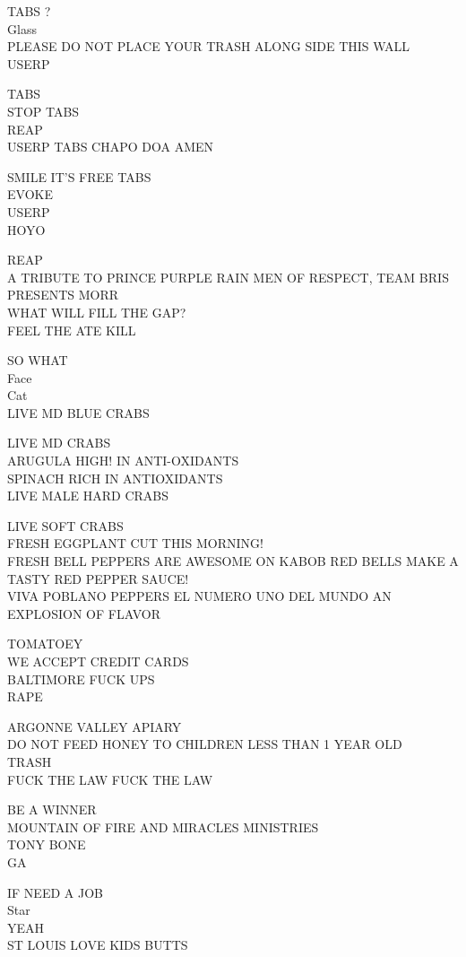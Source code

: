 \documentclass[10pt,letterpaper]{article}
\begin{document}
TABS ?\\
Glass\\
PLEASE DO NOT PLACE YOUR TRASH ALONG SIDE THIS WALL\\
USERP

TABS\\
STOP TABS\\
REAP\\
USERP TABS CHAPO DOA AMEN

SMILE IT'S FREE TABS\\
EVOKE\\
USERP\\
HOYO

REAP\\
A TRIBUTE TO PRINCE PURPLE RAIN MEN OF RESPECT, TEAM BRIS PRESENTS MORR\\
WHAT WILL FILL THE GAP?\\
FEEL THE ATE KILL

SO WHAT\\
Face\\
Cat\\
LIVE MD BLUE CRABS

LIVE MD CRABS\\
ARUGULA HIGH! IN ANTI{-}OXIDANTS\\
SPINACH RICH IN ANTIOXIDANTS\\
LIVE MALE HARD CRABS

LIVE SOFT CRABS\\
FRESH EGGPLANT CUT THIS MORNING!\\
FRESH BELL PEPPERS ARE AWESOME ON KABOB RED BELLS MAKE A TASTY RED PEPPER SAUCE!\\
VIVA POBLANO PEPPERS EL NUMERO UNO DEL MUNDO AN EXPLOSION OF FLAVOR

TOMATOEY\\
WE ACCEPT CREDIT CARDS\\
BALTIMORE FUCK UPS\\
RAPE

ARGONNE VALLEY APIARY\\
DO NOT FEED HONEY TO CHILDREN LESS THAN 1 YEAR OLD\\
TRASH\\
FUCK THE LAW FUCK THE LAW

BE A WINNER\\
MOUNTAIN OF FIRE AND MIRACLES MINISTRIES\\
TONY BONE\\
GA

IF NEED A JOB\\
Star\\
YEAH\\
ST LOUIS LOVE KIDS BUTTS
\end{document}
